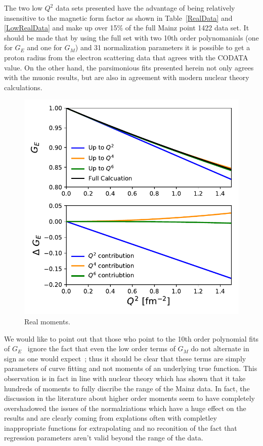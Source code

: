 \documentclass[10pt,aps,prc,twocolumn]{revtex4-1}
\begin{document}
The two low $Q^2$ data sets presented have the advantage of being relatively insensitive to the magnetic form 
factor as shown in Table~\ref{RealData} and \ref{LowRealData} and make up over
15\% of the full Mainz point 1422 data set.   It should be made that by using the full set with two 10th order polynomanials
(one for $G_E$ and one for $G_M$) and 31 normalization parameters it is possible to get a proton radius from the electron
scattering data that agrees with the 
CODATA value.     On the other hand,  the parsimonious fits presented herein not only agrees with the muonic results, but are also in
agreement with modern nuclear theory calculations.

\begin{figure}
\includegraphics[width=\columnwidth]{Figure/RealMoments.pdf}
\caption{Real moments.}
\end{figure}

We would like to point out that those who point to the 10th order polynomial fits of $G_E$~\cite{Sick:2017aor,Sick:2018fzn}
ignore the fact that even the low order terms of $G_M$ do not alternate in sign as one would expect~\cite{Bernauer:2010zga}; 
thus it should be clear that these terms are simply parameters of curve fitting and not 
moments of an underlying true function.   This observation is in fact in line with nuclear theory which has shown 
that it take hundreds of moments to fully discribe the range of the Mainz data.
In fact, the discussion in the literature about higher order moments seem to have
completely overshadowed the issues of the normalziations which have a huge effect on the results and are clearly 
coming from explations often with completley inappropriate functions for extrapolating and no reconition of the fact
that regression parameters aren't valid beyond the range of the data.
\end{document}
